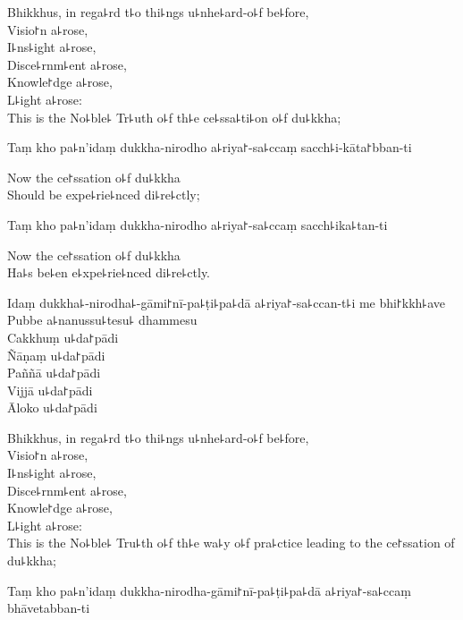 \begin{english}
  Bhikkhus, in rega꜕rd t꜕o thi꜕ngs u꜕nhe꜕ard-o꜕f be꜕fore,\\
  Visio꜓n a꜕rose,\\
  I꜕ns꜕ight a꜕rose,\\
  Disce꜕rnm꜕ent a꜕rose,\\
  Knowle꜓dge a꜕rose,\\
  L꜕ight a꜕rose:\\
  This is the No꜕ble꜕ Tr꜕uth o꜕f th꜕e ce꜕ssa꜕ti꜕on o꜕f du꜕kkha;
\end{english}

Taṃ kho pa꜕n'idaṃ dukkha-nirodho a꜕riya꜓-sa꜕ccaṃ sacch꜕i-kāta꜓bban-ti

\begin{english}
  Now the ce꜓ssation o꜕f du꜕kkha\\
  Should be expe꜕rie꜕nced di꜕re꜕ctly;
\end{english}

Taṃ kho pa꜕n'idaṃ dukkha-nirodho a꜕riya꜓-sa꜕ccaṃ sacch꜕ika꜕tan-ti

\begin{english}
  Now the ce꜓ssation o꜕f du꜕kkha\\
  Ha꜕s be꜕en e꜕xpe꜕rie꜕nced di꜕re꜕ctly.
\end{english}

Idaṃ dukkha꜕-nirodha꜕-gāmi꜓nī-pa꜕ṭi꜕pa꜕dā a꜕riya꜓-sa꜕ccan-t꜕i me bhi꜓kkh꜕ave\\
Pubbe a꜕nanussu꜕tesu꜕ dhammesu\\
Cakkhuṃ u꜕da꜓pādi\\
Ñāṇaṃ u꜕da꜓pādi\\
Paññā u꜕da꜓pādi\\
Vijjā u꜕da꜓pādi\\
Āloko u꜕da꜓pādi

\begin{english}
  Bhikkhus, in rega꜕rd t꜕o thi꜕ngs u꜕nhe꜕ard-o꜕f be꜕fore,\\
  Visio꜓n a꜕rose,\\
  I꜕ns꜕ight a꜕rose,\\
  Disce꜕rnm꜕ent a꜕rose,\\
  Knowle꜓dge a꜕rose,\\
  L꜕ight a꜕rose:\\
  This is the No꜕ble꜕ Tru꜕th o꜕f th꜕e wa꜕y o꜕f pra꜕ctice leading to the ce꜓ssation of du꜕kkha;
\end{english}

Taṃ kho pa꜕n'idaṃ dukkha-nirodha-gāmi꜓nī-pa꜕ṭi꜕pa꜕dā a꜕riya꜓-sa꜕ccaṃ bhāvetabban-ti

